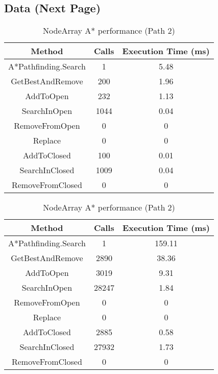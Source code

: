 \documentclass{article}
\begin{document}
  \subsection{Data (Next Page)}
  \begin{table}[h!]
    \parbox{.45\linewidth}{
      \centering
      \caption{NodeArray A* performance (Path 1)}
      \label{tab:tableNodeArray1}
      \begin{tabular}{c|c|c}
        \textbf{Method} & \textbf{Calls} & \textbf{Execution Time (ms)}\\
        \hline
        A*Pathfinding.Search  & 1 & 5.48\\
        GetBestAndRemove & 200 & 1.96\\
        AddToOpen & 232 & 1.13\\
        SearchInOpen & 1044 & 0.04\\
        RemoveFromOpen & 0 & 0\\
        Replace & 0 & 0\\
        AddToClosed & 100  & 0.01\\
        SearchInClosed & 1009 & 0.04\\
        RemoveFromClosed & 0 & 0\\
      \end{tabular}
    }
    \hfil
    \parbox{.45\linewidth}{
      \centering
      \label{tab:tableNodeArray2}
      \caption{NodeArray A* performance (Path 2)}
      \begin{tabular}{c|c|c}
        \textbf{Method} & \textbf{Calls} & \textbf{Execution Time (ms)}\\
        \hline
        A*Pathfinding.Search  & 1 & 159.11\\
        GetBestAndRemove & 2890 & 38.36\\
        AddToOpen & 3019 & 9.31\\
        SearchInOpen & 28247 & 1.84\\
        RemoveFromOpen & 0 & 0\\
        Replace & 0 & 0\\
        AddToClosed & 2885 & 0.58\\
        SearchInClosed & 27932  & 1.73\\
        RemoveFromClosed & 0 & 0\\
      \end{tabular}
    }
  \end{table}
\end{document}
